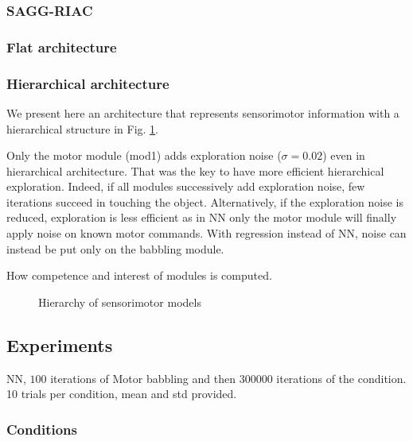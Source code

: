 \documentclass[10pt,letterpaper]{article}
\begin{document}
				
		
		\subsubsection{SAGG-RIAC}
			
			\cite{baranes_active_2013}
			
				
		
		\subsubsection{Flat architecture}
			
				
		
		\subsubsection{Hierarchical architecture}
			
			We present here an architecture that represents sensorimotor information with a hierarchical structure in Fig. \ref{H1}.
			
			Only the motor module (mod1) adds exploration noise ($\sigma=0.02$) even in hierarchical architecture. 
			That was the key to have more efficient hierarchical exploration. 
			Indeed, if all modules successively add exploration noise, few iterations succeed in touching the object. 
			Alternatively, if the exploration noise is reduced, exploration is less efficient as in NN only the motor module will finally apply noise on known motor commands. 
			With regression instead of NN, noise can instead be put only on the babbling module.
			
			How competence and interest of modules is computed.
			
			\begin{figure}[t]
				\center
				
				\caption{Hierarchy of sensorimotor models}
				\label{H1}					
			\end{figure}

				
		

	
	\subsection{Experiments}
		
		NN, $100$ iterations of Motor babbling and then $300000$ iterations of the condition. 10 trials per condition, mean and std provided.
		
		
		\subsubsection{Conditions}
			
\end{document}
